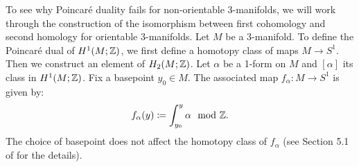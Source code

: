 To see why Poincar\'e duality fails for non-orientable 3-manifolds, we will work through the construction of the isomorphism between first cohomology and second homology for orientable 3-manifolds.  Let $M$ be a 3-manifold.
To define the Poincar\'e dual of $H^1(M;\mathbb{Z})$, we first define a homotopy class of maps $M\rightarrow S^1$.  Then we construct an element of $H_2(M;\mathbb{Z})$.
Let $\alpha$ be a 1-form on $M$ and $[\alpha]$ its class in $H^1(M; \mathbb{Z})$.  Fix a basepoint $y_0\in M$.
The associated map $f_{\alpha}:M\rightarrow S^1$ is given by:
\begin{align}\label{form:map}
  f_{\alpha}(y) \coloneqq  \int_{y_0}^y \alpha \mod {\mathbb{Z}}.
\end{align}
The choice of basepoint does not affect the homotopy class of $f_\alpha$
(see Section 5.1 of \cite{calegari2007foliations} for the details).

